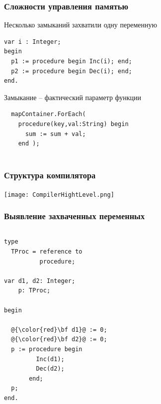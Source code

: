 \documentclass[roman,12pt]{beamer}
\newenvironment{changemargin}[2]{%
  \begin{list}{}{%
    \setlength{\topsep}{0pt}%
    \setlength{\leftmargin}{#1}%
    \setlength{\rightmargin}{#2}%
    \setlength{\listparindent}{\parindent}%
    \setlength{\itemindent}{\parindent}%
    \setlength{\parsep}{\parskip}%
  }%
  \item[]}{\end{list}}
\newcommand\Fontvi{\fontsize{11}{14}\selectfont}
\begin{document}
\begin{frame}[fragile]
  \frametitle{Сложности управления памятью}
 \begin{block}{Несколько замыканий захватили одну переменную}
   \begin{lstlisting}
var i : Integer;
begin
  p1 := procedure begin Inc(i); end;
  p2 := procedure begin Dec(i); end;
end.
   \end{lstlisting}
  \end{block}
 \begin{block}{Замыкание -- фактический параметр функции}
   \begin{lstlisting}
  mapContainer.ForEach(
    procedure(key,val:String) begin
      sum := sum + val;
    end );
                         
    \end{lstlisting}
  \end{block}
\end{frame}

\begin{frame}[fragile]
  \frametitle{Структура компилятора}

 
\begin{center}
\Fontvi
\begin{changemargin}{-0.5cm}{0cm} 
  \texttt{[image: CompilerHightLevel.png]}
\end{changemargin}
\end{center}

\end{frame}



\begin{frame}[fragile]
  \frametitle{Выявление захваченных переменных}
  \begin{columns}[c]
    \column{2.2in}
      \begin{lstlisting}[escapechar=@,basicstyle=\footnotesize]
type 
  TProc = reference to
          procedure;

var d1, d2: Integer;
    p: TProc;

begin

  @{\color{red}\bf d1}@ := 0;
  @{\color{red}\bf d2}@ := 0;
  p := procedure begin
         Inc(d1);
         Dec(d2);
       end;
  p;
end.
     \end{lstlisting}
   \column{2.2in}
  \end{columns}
\end{frame}
\end{document}
